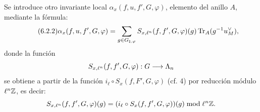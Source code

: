 Se introduce otro invariante local $\alpha_x(f,u,f',G,\varphi)$, elemento del anillo $A$, mediante la fórmula:
\begin{equation}\tag{6.2.2}
\alpha_x(f,u,f',G,\varphi)=
\sum_{g\in G_{\natural,\varphi}}
S_{x,\ell^n}(f,f',G,\varphi)(g)\operatorname{Tr}_A(g^{-1}u_M^\vee),
\end{equation}
donde la función
\[
S_{x,\ell^n}(f,f',G,\varphi):G\longrightarrow\Lambda_n
\]
se obtiene a partir de la función $i_\ell\circ S_x(f,F',G,\varphi)$ (cf. 4) por reducción módulo $\ell^n\mathbb Z$, es decir:%
\[
S_{x,\ell^n}(f,f',G,\varphi)(g)=
(i_\ell\circ S_x(f,f',G,\varphi))(g)\bmod \ell^n\mathbb Z.
\]
